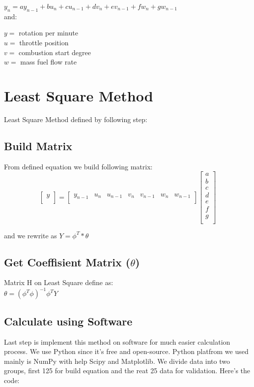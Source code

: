 \documentclass{article}
\begin{document}
\hspace{10pt} $y_n = ay_{n-1} + bu_n + cu_{n-1} + dv_n + ev_{n-1} + fw_n + gw_{n-1}$\\

and:

\noindent$y =$ rotation per minute\\
$u =$ throttle position\\
$v =$ combustion start degree\\
$w =$ mass fuel flow rate

\section{Least Square Method}

Least Square Method defined by following step:

\subsection{Build Matrix}
From defined equation we build following matrix:
\[
\begin{bmatrix}
    y \\
\end{bmatrix}
=
\begin{bmatrix}
	y_{n-1} & u_n & u_{n-1} & v_n & v_{n-1} & w_n & w_{n-1} \\
\end{bmatrix}
\begin{bmatrix}
    a \\
    b \\
    c \\
    d \\
    e \\
    f \\
    g \\
\end{bmatrix}
\]

and we rewrite as $Y = \phi^T * \theta$

\subsection{Get Coeffisient Matrix ($\theta$)}
Matrix H on Least Square define as:\\

$\theta = (\phi^T\phi)^{-1}\phi^TY $ 

\subsection{Calculate using Software}
Last step is implement this method on software for much easier calculation process.
We use Python since it's free and open-source.
Python platfrom we used mainly is NumPy with help Scipy and Matplotlib.
We divide data into two groups, first 125 for build equation and the reat 25 data for validation.
Here's the code:\\
\inputminted{python}{least_square.py}
\end{document}
